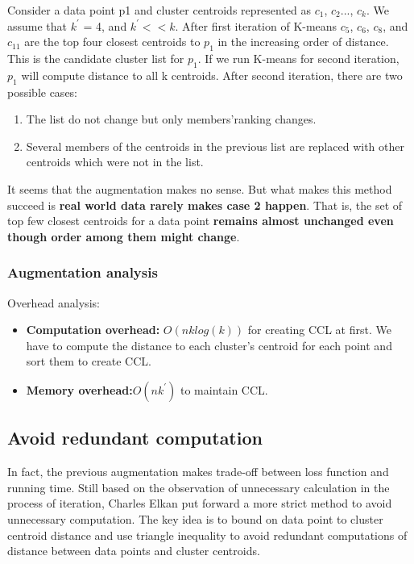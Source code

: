 \documentclass[11pt]{article}
\begin{document}
Consider a data point p1 and cluster centroids represented as $c_1$, $c_2$..., $c_k$. We assume that $k^{\prime}$ = 4, and $k^{\prime} << k $. After first iteration of K-means $c_5$, $c_6$, $c_8$, and $c_{11}$ are the top four closest centroids to $p_1$ in the increasing order of distance. This is the candidate cluster list for $p_1$. If we run K-means for second iteration, $p_1$ will compute distance to all k centroids. After second iteration, there are two possible cases:
\begin{enumerate}
\item The list do not change but only members'ranking changes.
\item Several members of the centroids in the previous list are replaced with other centroids which were not in the list.
\end{enumerate}
It seems that the augmentation makes no sense. But what makes this method succeed is \textbf{real world data rarely makes case 2 happen}. That is, the set of top few closest centroids for a data point \textbf{remains almost unchanged even though order among them might change}.
\subsubsection{Augmentation analysis}
Overhead analysis:
\begin{itemize}
\item \textbf{Computation overhead:} $O(nklog(k))$ for creating CCL at first. We have to compute the distance to each cluster's centroid for each point and sort them to create CCL. 
\item \textbf{Memory overhead:}$ O(nk^{\prime})$ to maintain CCL.
\end{itemize}
\par

\subsection{Avoid redundant computation}
In fact, the previous augmentation \cite{Faster} makes trade-off between loss function and running time. Still based on the observation of  unnecessary calculation in the process of iteration, Charles Elkan put forward a more strict method to avoid unnecessary computation.\cite{articleToBound} The key idea is to bound on data point to cluster centroid distance and use triangle inequality to avoid redundant computations of distance between data points and cluster centroids.
\end{document}

